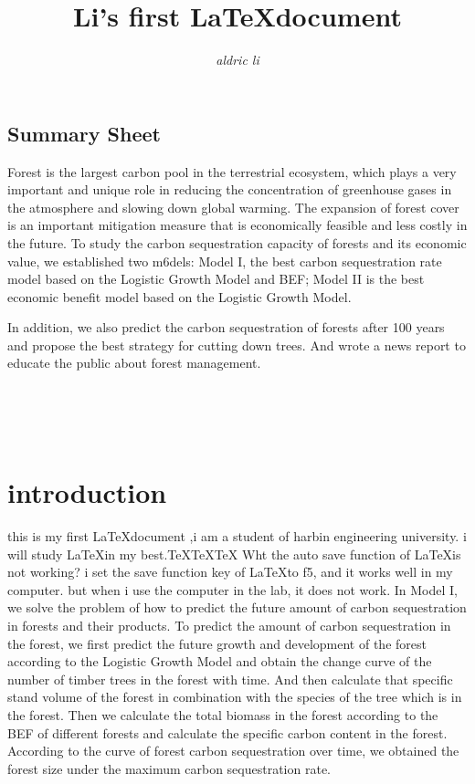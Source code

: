 \documentclass{article}
\title{Li's first \LaTeX\enspace document}
\author{\emph{aldric li}}
\begin{document}
\maketitle
{\subsection*{Summary Sheet}}
{\large 	Forest is the largest carbon pool in the terrestrial ecosystem, which plays a very important and unique role
    in reducing the concentration of greenhouse gases in the atmosphere and slowing down global warming.
    The expansion of forest cover is an important mitigation measure that is economically feasible and less costly in the future.
    To study the carbon sequestration capacity of forests and its economic value,
    we established two m6dels: Model I, the best carbon sequestration rate model based on the Logistic Growth Model and BEF;
    Model II is the best economic benefit model based on the Logistic Growth Model.

    In addition, we also predict the carbon sequestration of forests after 100
    years and propose the best strategy for cutting down trees. And wrote a news
    report to educate the public about forest management.}

~\\~\\~\\

\tableofcontents
\section{introduction}
this is my first \LaTeX document ,i am a student of harbin engineering university.
i will study \LaTeX in my best.\TeX\TeX\TeX
Wht the auto save function of \LaTeX is not working?
i set the save function key of \LaTeX to f5, and it works well in my computer.
but when i use the computer in the lab, it does not work.
In Model I, we solve the problem of how to predict the future amount of carbon
sequestration in forests and their products. To predict the amount of carbon
sequestration in the forest, we first predict the future growth and development
of the forest according to the Logistic Growth Model and obtain the change
curve of the number of timber trees in the forest with time. And then calculate
that specific stand volume of the forest in combination with the species of the
tree which is in the forest. Then we calculate the total biomass in the forest
according to the BEF of different forests and calculate the specific carbon
content in the forest. According to the curve of forest carbon sequestration
over time, we obtained the forest size under the maximum carbon sequestration
rate.
\end{document}
